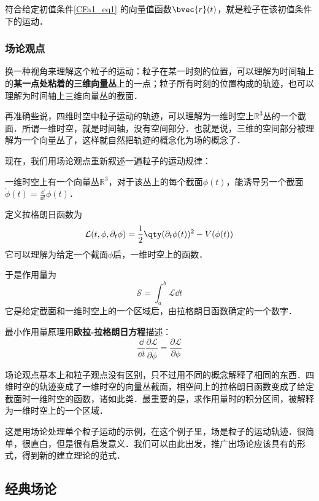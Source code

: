 符合给定初值条件\autoref{CFa1_eq1} 的向量值函数$\bvec{r}(t)$，就是粒子在该初值条件下的运动．


\subsubsection{场论观点}

换一种视角来理解这个粒子的运动：粒子在某一时刻的位置，可以理解为时间轴上的\textbf{某一点处粘着的三维向量丛}上的一点；粒子所有时刻的位置构成的轨迹，也可以理解为时间轴上三维向量丛的截面．

再准确些说，四维时空中粒子运动的轨迹，可以理解为一维时空上$\mathbb{R}^3$丛的一个截面．所谓一维时空，就是时间轴，没有空间部分．也就是说，三维的空间部分被理解为一个向量丛了，这样就自然把轨迹的概念化为场的概念了．

现在，我们用场论观点重新叙述一遍粒子的运动规律：

一维时空上有一个向量丛$\mathbb{R}^3$，对于该丛上的每个截面$\phi(t)$，能诱导另一个截面$\dot{\phi}(t)=\frac{\dd}{\dd t}\phi(t)$．

定义拉格朗日函数为
\begin{equation}\label{CFa1_eq2}
\mathcal{L}(t, \phi, \partial_t\phi) = \frac{1}{2}\qty(\partial_t \phi(t))^2 - V(\phi(t))
\end{equation}
它可以理解为给定一个截面$\phi$后，一维时空上的函数．

于是作用量为
\begin{equation}\label{CFa1_eq4}
\mathcal{S}=\int_a^b \mathcal{L}\dd t
\end{equation}
它是给定截面和一维时空上的一个区域后，由拉格朗日函数确定的一个数字．

最小作用量原理用\textbf{欧拉-拉格朗日方程}描述：
\begin{equation}
\frac{\dd}{\dd t}\frac{\partial\mathcal{L}}{\partial\dot{\phi}} = \frac{\partial \mathcal{L}}{\partial\phi}
\end{equation}

场论观点基本上和粒子观点没有区别，只不过用不同的概念解释了相同的东西．四维时空的轨迹变成了一维时空的向量丛截面，相空间上的拉格朗日函数变成了给定截面时一维时空的函数，诸如此类．最重要的是，求作用量时的积分区间，被解释为一维时空上的一个区域．

这是用场论处理单个粒子运动的示例，在这个例子里，场是粒子的运动轨迹．很简单，很直白，但是很有启发意义．我们可以由此出发，推广出场论应该具有的形式，得到新的建立理论的范式．


\subsection{经典场论}

